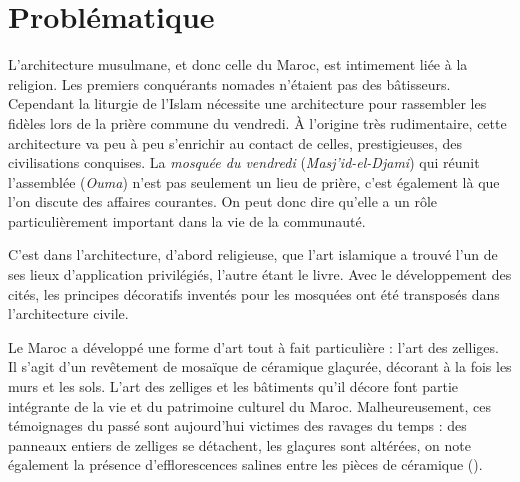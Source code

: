 
\chapter{Problématique}

\renewcommand{\putstuffinpic}{%
  \put(100,-140){%
    \makebox(0,0){%
      \texttt{[image: alteration\_1]}%
      \quad%
      \texttt{[image: alteration\_2]}%
    }%
  }%
}
\newcommand{\mycut}{%
  0.5\textwidth,
  0.5\textwidth,
  0.5\textwidth,
  0.5\textwidth,
  0.5\textwidth,
  0.5\textwidth,
  0.5\textwidth,
  0.5\textwidth,
  0.5\textwidth,
  0.5\textwidth,
  0.5\textwidth,
  0.5\textwidth,
  0.5\textwidth,
  0.5\textwidth,
  0.5\textwidth%
}%
\opencutleft%
L'architecture musulmane, et donc celle du Maroc, est intimement 
liée à la religion. Les premiers conquérants nomades n'étaient pas 
des bâtisseurs. Cependant la liturgie de l'Islam nécessite une 
architecture pour rassembler les fidèles lors de la prière commune du 
vendredi. À l'origine très rudimentaire, cette architecture va peu à 
peu s'enrichir au contact de celles, prestigieuses, des civilisations 
conquises. La \emph{mosquée du vendredi} (\emph{Masj'id-el-Djami}) 
qui réunit l'assemblée (\emph{Ouma}) n'est pas seulement un lieu de 
prière, c'est également là que l'on discute des affaires courantes. 
On peut donc dire qu'elle a un rôle particulièrement important dans 
la vie de la communauté.

C'est dans l'architecture, d'abord religieuse, que l'art islamique a 
trouvé l'un de ses lieux d'application privilégiés, l'autre étant le 
livre. Avec le développement des cités, les principes décoratifs 
inventés pour les mosquées ont été transposés dans l'architecture 
civile.

Le Maroc a développé une forme d'art tout à fait particulière : 
l'art des zelliges. Il s'agit d'un revêtement de mosaïque de 
céramique glaçurée, décorant à la fois les murs et les sols.
L'art des zelliges et les bâtiments qu'il décore font partie 
intégrante de la vie et du patrimoine culturel du Maroc. 
Malheureusement, ces témoignages du passé sont aujourd'hui 
victimes des ravages du temps : des panneaux entiers de zelliges 
se détachent, les glaçures sont altérées, on note également la 
présence d'efflorescences salines entre les pièces de céramique
().


